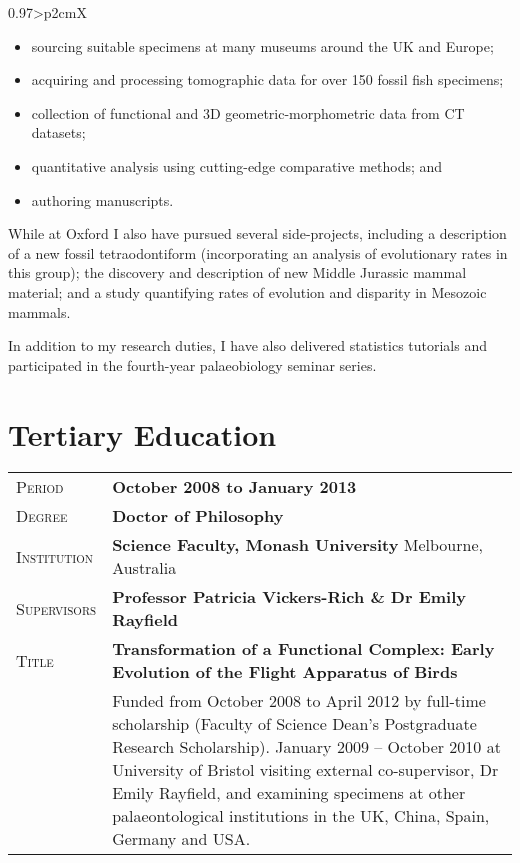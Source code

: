 \documentclass[a4paper, oneside, final]{scrartcl} %
\newcommand{\gray}{\rowcolor[gray]{1}} %
\begin{document}
\begin{center}
\begin{tabularx}{0.97\linewidth}{>{\raggedleft\scshape}p{2cm}X}
\begin{itemize}[noitemsep]
  \item sourcing suitable specimens at many museums around the UK and Europe;
  \item acquiring and processing tomographic data for over 150 fossil fish specimens;
  \item collection of functional and 3D geometric-morphometric data from CT datasets;
  \item quantitative analysis using cutting-edge comparative methods; and
  \item authoring manuscripts.
\end{itemize}

While at Oxford I also have pursued several side-projects, including a description of a new fossil tetraodontiform (incorporating an analysis of evolutionary rates in this group); the discovery and description of new Middle Jurassic mammal material; and a study quantifying rates of evolution and disparity in Mesozoic mammals. 

\vspace{6pt}

In addition to my research duties, I have also delivered statistics tutorials and participated in the fourth-year palaeobiology seminar series.
\end{tabularx}



\section{Tertiary Education}

\begin{tabularx}{0.97\linewidth}{>{\raggedleft\scshape}p{2cm}X}
\gray Period & \textbf{October 2008 to January 2013}\\
\gray Degree & \textbf{Doctor of Philosophy}\\
\gray Institution & \textbf{Science Faculty, Monash University} \hfill Melbourne, Australia\\
\gray Supervisors & \textbf{Professor Patricia Vickers-Rich \& Dr Emily Rayfield}\\
\gray Title & \textbf{Transformation of a Functional Complex: Early Evolution of the Flight Apparatus of Birds}\\
& Funded from October 2008 to April 2012 by full-time scholarship (Faculty of Science Dean's Postgraduate Research Scholarship). January 2009 -- October 2010 at University of Bristol visiting external co-supervisor, Dr Emily Rayfield, and examining specimens at other palaeontological institutions in the UK, China, Spain, Germany and USA.
\end{tabularx}


\end{center}
\end{document}
